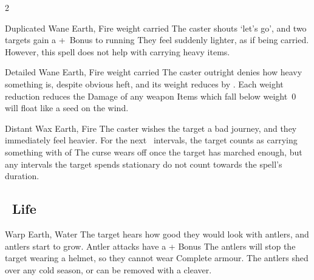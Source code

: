 \begin{multicols}{2}
{  %
    {Duplicated}%
    {Wane}%
    {Earth, Fire}%
    {\gls{weight} carried}%
    {The caster shouts `let's go', and two targets gain a +~Bonus to running}%
    {They feel suddenly lighter, as if being carried.
    However, this spell does not help with carrying heavy items.}

    {Detailed}%
    {Wane}%
    {Earth, Fire}%
    {\gls{weight} carried}%
    {The caster outright denies how heavy something is, despite obvious heft, and its \gls{weight} reduces by .
    Each \gls{weight} reduction reduces the Damage of any weapon}%
    {Items which fall below \gls{weight}~0 will float like a seed on the wind.}

    {Distant}%
    {Wax}%
    {Earth, Fire}%
    {}%
    {The caster wishes the target a bad journey, and they immediately feel heavier.
    For the next ~\glspl{interval}, the target counts as carrying something with  of }%
    {
    The curse wears off once the target has marched enough, but any \glspl{interval} the target spends stationary do not count towards the spell's duration.}






  \subsection[Life]{~Life}
  \label{lifeSpells}


    {}%
    {Warp}%
    {Earth, Water}%
    {}%
    {The target hears how good they would look with antlers, and antlers start to grow.
    Antler attacks have a + Bonus}%
    {
    The antlers will stop the target wearing a helmet, so they cannot wear Complete armour.
    The antlers shed over any cold season, or can be removed with a cleaver.}

}
\end{multicols}
